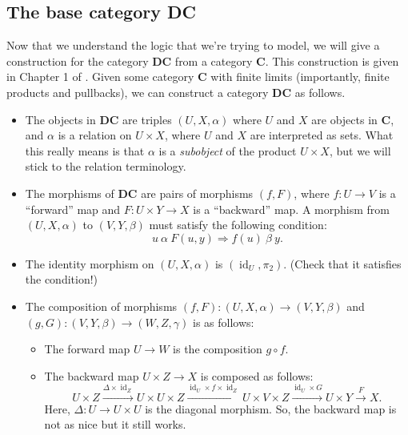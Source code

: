 \documentclass[a4paper]{article}
\newcommand{\DC}{\textbf{DC}}
\newcommand{\C}{\textbf{C}}
\DeclareMathOperator{\id}{id}
\begin{document}
\subsection{The base category \DC}
Now that we understand the logic that we're trying to model, we will give a construction for the category \DC{} from a category \C{}. This construction is given in Chapter 1 of \cite{de1991dialectica}. Given some category \C{} with finite limits (importantly, finite products and pullbacks), we can construct a category \textbf{DC} as follows.
\begin{itemize}
    \item The objects in \textbf{DC} are triples $(U, X,\alpha)$ where $U$ and $X$ are objects in \C{}, and $\alpha$ is a relation on $U\times X$, where $U$ and $X$ are interpreted as sets. What this really means is that $\alpha$ is a \emph{subobject} of the product $U\times X$, but we will stick to the relation terminology.
    \item The morphisms of \textbf{DC} are pairs of morphisms $(f, F)$, where $f:U\to V$ is a ``forward'' map and $F:U\times Y\to X$ is a ``backward'' map. A morphism from $(U,X,\alpha)$ to $(V,Y,\beta)$ must satisfy the following condition:
    \begin{equation*}
        u\ \alpha\ F(u,y)\Rightarrow f(u)\ \beta\ y.
    \end{equation*}
    \item The identity morphism on $(U,X,\alpha)$ is $(\id_U, \pi_2)$. (Check that it satisfies the condition!)
    \item The composition of morphisms $(f,F):(U,X,\alpha)\to (V,Y,\beta)$ and $(g,G):(V,Y,\beta)\to (W,Z,\gamma)$ is as follows:
    \begin{itemize}
        \item The forward map $U\to W$ is the composition $g\circ f$.
        \item The backward map $U\times Z\to X$ is composed as follows:
        \begin{equation*}
            U\times Z\xrightarrow{\Delta\times \id_Z}U\times U\times Z\xrightarrow{\id_U\times f\times \id_Z}U\times V\times Z\xrightarrow{\id_U\times G}U\times Y\xrightarrow{F}X.
        \end{equation*}
        Here, $\Delta:U\to U\times U$ is the diagonal morphism. So, the backward map is not as nice but it still works.
    \end{itemize}
\end{itemize}
\end{document}

